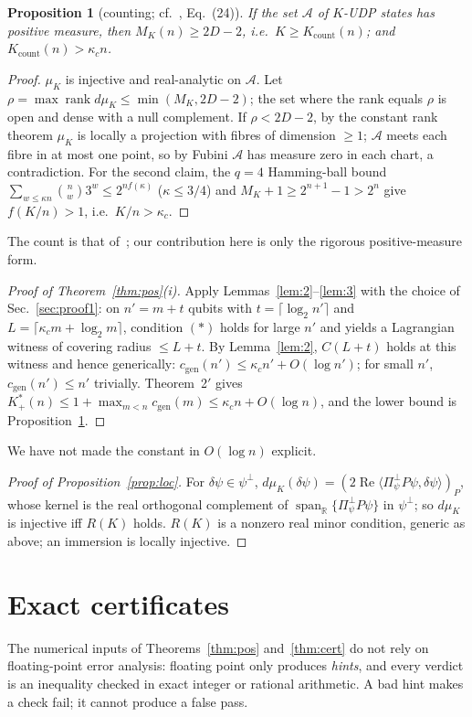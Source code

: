 \documentclass[aps,pra,onecolumn,superscriptaddress,nofootinbib,longbibliography,10pt]{revtex4-2}
\newtheorem{proposition}{Proposition}[section]
\theoremstyle{definition}
\newcommand{\RR}{\mathbb R}
\newcommand{\spanR}{\operatorname{span}_{\RR}}
\newcommand{\Pperp}{\Pi^{\perp}_{\psi}}
\newcommand{\kc}{\kappa_c}
\newcommand{\Kp}{K^{*}_{+}}
\newcommand{\Kc}{K_{\mathrm{count}}}
\newcommand{\cgen}{c_{\mathrm{gen}}}
\begin{document}
\begin{proposition}[counting; cf.~\cite{LW02}, Eq.~(24)]\label{prop:count}
If the set $\mathcal A$ of $K$-UDP states has positive measure, then $M_K(n)\ge2D-2$, i.e.\ $K\ge\Kc(n)$; and $\Kc(n)>\kc n$.
\end{proposition}
\begin{proof}
$\mu_K$ is injective and real-analytic on $\mathcal A$. Let $\rho=\max\operatorname{rank}d\mu_K\le\min(M_K,2D-2)$; the set where the rank equals $\rho$ is open and dense with a null complement. If $\rho<2D-2$, by the constant rank theorem $\mu_K$ is locally a projection with fibres of dimension $\ge1$; $\mathcal A$ meets each fibre in at most one point, so by Fubini $\mathcal A$ has measure zero in each chart, a contradiction. For the second claim, the $q=4$ Hamming-ball bound $\sum_{w\le\kappa n}\binom nw3^w\le2^{nf(\kappa)}$ ($\kappa\le3/4$) and $M_K+1\ge2^{n+1}-1>2^n$ give $f(K/n)>1$, i.e.\ $K/n>\kc$.
\end{proof}
\noindent The count is that of~\cite{LW02}; our contribution here is only the rigorous positive-measure form.

\begin{proof}[Proof of Theorem~\ref{thm:pos}(i)]
Apply Lemmas~\ref{lem:2}--\ref{lem:3} with the choice of Sec.~\ref{sec:proof1}: on $n'=m+t$ qubits with $t=\lceil\log_2n'\rceil$ and $L=\lceil\kc m+\log_2m\rceil$, condition $(*)$ holds for large $n'$ and yields a Lagrangian witness of covering radius $\le L+t$. By Lemma~\ref{lem:2}, $C(L+t)$ holds at this witness and hence generically: $\cgen(n')\le\kc n'+O(\log n')$; for small $n'$, $\cgen(n')\le n'$ trivially. Theorem~2$'$ gives $\Kp(n)\le1+\max_{m<n}\cgen(m)\le\kc n+O(\log n)$, and the lower bound is Proposition~\ref{prop:count}.
\end{proof}
\noindent We have not made the constant in $O(\log n)$ explicit.

\begin{proof}[Proof of Proposition~\ref{prop:loc}]
For $\delta\psi\in\psi^\perp$, $d\mu_K(\delta\psi)=(2\operatorname{Re}\langle\Pperp P\psi,\delta\psi\rangle)_P$, whose kernel is the real orthogonal complement of $\spanR\{\Pperp P\psi\}$ in $\psi^\perp$; so $d\mu_K$ is injective iff $R(K)$ holds. $R(K)$ is a nonzero real minor condition, generic as above; an immersion is locally injective.
\end{proof}

\section{Exact certificates}\label{sec:exact}
The numerical inputs of Theorems~\ref{thm:pos} and~\ref{thm:cert} do not rely on floating-point error analysis: floating point only produces \emph{hints}, and every verdict is an inequality checked in exact integer or rational arithmetic. A bad hint makes a check fail; it cannot produce a false pass.
\end{document}
